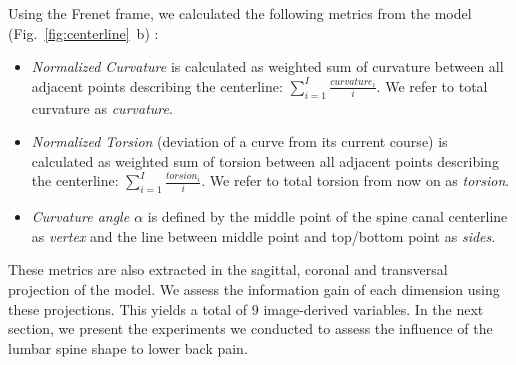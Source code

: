 \documentclass[a4paper,twoside]{style/article}
\newcommand{\com}[1]{\textcolor{orange}{\uline{#1}}}
\begin{document}
Using the Frenet frame, we calculated the following metrics from the model (Fig.~\ref{fig:centerline}~b) \cite{Frenet}:
\begin{itemize}
	\item \emph{Normalized Curvature} is calculated as weighted sum of curvature between all adjacent points describing the centerline: $\sum_{i=1}^I \frac{curvature_i}{i}$. We refer to total curvature as \emph{curvature}.
	\item \emph{Normalized Torsion} (deviation of a curve from its current course) is calculated as weighted sum of torsion between all adjacent points describing the centerline: $\sum_{i=1}^I \frac{torsion_i}{i}$. We refer to total torsion from now on as \emph{torsion}.
	\item \emph{Curvature angle $\alpha$} is defined by the middle point of the spine canal centerline as \emph{vertex} and the line between middle point and top/bottom point as \emph{sides}.
\end{itemize}
These metrics are also extracted in the sagittal, coronal and transversal projection of the model.
We assess the information gain of each dimension using these projections.
This yields a total of 9 image-derived variables.
In the next section, we present the experiments we conducted to assess the influence of the lumbar spine shape to lower back pain.


\end{document}
